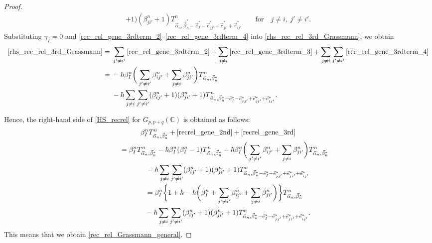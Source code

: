 \documentclass[10pt,a4paper]{amsart}
\numberwithin{equation}{section}
\begin{document}
\begin{proof}
\begin{gather}
 +
 1
 )
 (
 \beta_{ji'}^{n}
 +
 1
 )
 T^{n}_{\vec{\alpha}_{n},\vec{\beta}_{n}^{\ast}-\vec{e}_{I}^{\ast}-\vec{e}_{jj'}^{\ast}+\vec{e}_{ji'}^{\ast}+\vec{e}_{ij'}^{\ast}}
 \qquad
 \textrm{for}
\quad
 j
 \neq
 i,
\
 j'
 \neq
 i'
 .
 \label{rec_rel_gene_3rdterm_4}
\end{gather}
Substituting $\gamma_{I}=0$ and \eqref{rec_rel_gene_3rdterm_2}--\eqref{rec_rel_gene_3rdterm_4} into \eqref{rhs_rec_rel_3rd_Grassmann}, we obtain
\begin{align}
 \eqref{rhs_rec_rel_3rd_Grassmann}
={}&
 \sum_{
 j'
 \neq
 i'
 }
 \eqref{rec_rel_gene_3rdterm_2}
 +
 \sum_{
 j
 \neq
 i
 }
 \eqref{rec_rel_gene_3rdterm_3}
 +
 \sum_{
 j
 \neq
 i
 }
 \sum_{
 j'
 \neq
 i'
 }
 \eqref{rec_rel_gene_3rdterm_4}
 \nonumber
 \\
={}&
 -
 \hbar
 \beta_{I}^{n}
 \bigg(
 \sum_{
 j'
 \neq
 i'
 }
 \beta_{ij'}^{n}
 +
 \sum_{
 j
 \neq
 i
 }
 \beta_{ji'}^{n}
 \bigg)
 T^{n}_{\vec{\alpha}_{n},\vec{\beta}_{n}^{\ast}}\nonumber\\
 &
 -
 \hbar
 \sum_{
 j
 \neq
 i
 }
 \sum_{
 j'
 \neq
 i'
 }
 (
 \beta_{ij'}^{n}
 +
 1
 )
 (
 \beta_{ji'}^{n}
 +
 1
 )
 T^{n}_{\vec{\alpha}_{n},\vec{\beta}_{n}^{\ast}-\vec{e}_{I}^{\ast}-\vec{e}_{jj'}^{\ast}+\vec{e}_{ji'}^{\ast}+\vec{e}_{ij'}^{\ast}}.
 \label{recrel_gene_3rd}
\end{align}

Hence, the right-hand side of \eqref{HS_recrel} for $G_{p,p+q}(\mathbb{C})$ is obtained as follows:
\begin{gather}
 \beta_{I}^{n}
 T^{n}_{\vec{\alpha}_{n},\vec{\beta}_{n}^{\ast}}
 +
 \eqref{recrel_gene_2nd}
 +
 \eqref{recrel_gene_3rd}\nonumber\\
 \qquad
 =
 \beta_{I}^{n}
 T^{n}_{\vec{\alpha}_{n},\vec{\beta}_{n}^{\ast}}
 -
 \hbar
 \beta_{I}^{n}
 (
 \beta_{I}^{n}
 -
 1
 )
 T^{n}_{\vec{\alpha}_{n},\vec{\beta}_{n}^{\ast}}
 -
 \hbar
 \beta_{I}^{n}
 \bigg(
 \sum_{
 j'
 \neq
 i'
 }
 \beta_{ij'}^{n}
 +
 \sum_{
 j
 \neq
 i
 }
 \beta_{ji'}^{n}
 \bigg)
 T^{n}_{\vec{\alpha}_{n},\vec{\beta}_{n}^{\ast}}
 \nonumber
 \\
\phantom{\qquad
 =}{}
 -
 \hbar
 \sum_{
 j
 \neq
 i
 }
 \sum_{
 j'
 \neq
 i'
 }
 (
 \beta_{ij'}^{n}
 +
 1
 )
 (
 \beta_{ji'}^{n}
 +
 1
 )
 T^{n}_{\vec{\alpha}_{n},\vec{\beta}_{n}^{\ast}-\vec{e}_{I}^{\ast}-\vec{e}_{jj'}^{\ast}+\vec{e}_{ji'}^{\ast}
 +\vec{e}_{ij'}^{\ast}}
 \nonumber
 \\
\qquad
 =
 \beta_{I}^{n}
 \bigg\{
 1
 +
 \hbar
 -
 \hbar
 \bigg(
 \beta_{I}^{n}
 +
 \sum_{
 j'
 \neq
 i'
 }
 \beta_{ij'}^{n}
 +
 \sum_{
 j
 \neq
 i
 }
 \beta_{ji'}^{n}
 \bigg)
 \bigg\}
 T^{n}_{\vec{\alpha}_{n},\vec{\beta}_{n}^{\ast}}
 \nonumber
 \\
 \phantom{\qquad
 =}{}
 -
 \hbar
 \sum_{
 j
 \neq
 i
 }
 \sum_{
 j'
 \neq
 i'
 }
 (
 \beta_{ij'}^{n}
 +
 1
 )
 (
 \beta_{ji'}^{n}
 +
 1
 )
 T^{n}_{\vec{\alpha}_{n},\vec{\beta}_{n}^{\ast}-\vec{e}_{I}^{\ast}-\vec{e}_{jj'}^{\ast}+\vec{e}_{ji'}^{\ast}+\vec{e}_{ij'}^{\ast}}.
 \label{recrel_gene_right_mid}
\end{gather}
This means that we obtain \eqref{rec_rel_Grassmann_general}.%
\end{proof}
\end{document}
